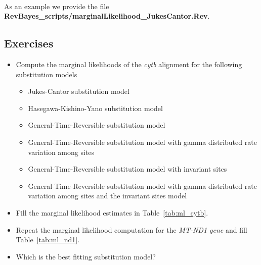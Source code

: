 \noindent \\ \impmark As an example we provide the file \textbf{RevBayes\_scripts/marginalLikelihood\_JukesCantor.Rev}.


\subsection{Exercises}

\begin{itemize}
\item Compute the marginal likelihoods of the \textit{cytb} alignment for the following substitution models
\begin{itemize}
\item Jukes-Cantor substitution model
\item Hasegawa-Kishino-Yano substitution model
\item General-Time-Reversible substitution model
\item General-Time-Reversible substitution model with gamma distributed rate variation among sites
\item General-Time-Reversible substitution model with invariant sites
\item General-Time-Reversible substitution model with gamma distributed rate variation among sites and the invariant sites model
\end{itemize}
\item Fill the marginal likelihood estimates in Table~\ref{tab:ml_cytb}.
\item Repeat the marginal likelihood computation for the \textit{MT-ND1 gene} and fill Table~\ref{tab:ml_nd1}.
\item Which is the best fitting substitution model?
\end{itemize}

